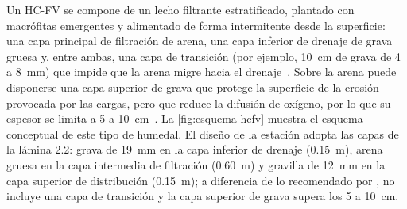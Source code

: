 Un HC-FV se compone de un lecho filtrante estratificado, plantado con macrófitas emergentes y alimentado de forma intermitente desde la superficie: una capa principal de filtración de arena, una capa inferior de drenaje de grava gruesa y, entre ambas, una capa de transición (por ejemplo, \qty{10}{\centi\meter} de grava de 4 a \qty{8}{\milli\meter}) que impide que la arena migre hacia el drenaje~\parencite{dotro2021humedales}.
Sobre la arena puede disponerse una capa superior de grava que protege la superficie de la erosión provocada por las cargas, pero que reduce la difusión de oxígeno, por lo que su espesor se limita a 5 a \qty{10}{\centi\meter}~\parencite{dotro2021humedales}.
La \cref{fig:esquema-hcfv} muestra el esquema conceptual de este tipo de humedal.
El diseño de la estación adopta las capas de la lámina 2.2: grava de \qty{19}{\milli\meter} en la capa inferior de drenaje (\qty{0.15}{\meter}), arena gruesa en la capa intermedia de filtración (\qty{0.60}{\meter}) y gravilla de \qty{12}{\milli\meter} en la capa superior de distribución (\qty{0.15}{\meter}); a diferencia de lo recomendado por \textcite{dotro2021humedales}, no incluye una capa de transición y la capa superior de grava supera los 5 a \qty{10}{\centi\meter}.

